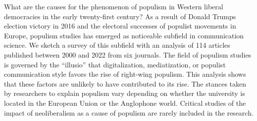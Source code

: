\documentclass{tufte-handout}
\begin{document}
\begin{titlepage}
What are the causes for the phenomenon of populism in Western liberal
democracies in the early twenty-first century? As a result of Donald
Trump\textquotesingle s election victory in 2016 and the electoral
successes of populist movements in Europe, populism studies has emerged
as noticeable subfield in communication science. We sketch a survey of
this subfield with an analysis of 114 articles published between 2000
and 2022 from six journals. The field of populism studies is governed by
the ``illusio'' that digitalization, mediatization, or populist
communication style favors the rise of right-wing populism. This
analysis shows that these factors are unlikely to have contributed to
its rise. The stances taken by researchers to explain populism vary
depending on whether the university is located in the European Union or
the Anglophone world. Critical studies of the impact of neoliberalism as
a cause of populism are rarely included in the research.





\enlargethispage{2\baselineskip}

\vspace*{18em}



 \end{titlepage}

\end{document}
